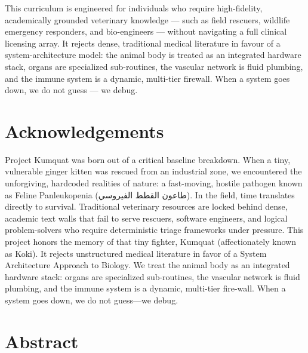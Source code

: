 \documentclass[12pt,oneside]{book}
\newcommand{\ar}[1]{\textarabic{#1}}
\begin{document}
\noindent This curriculum is engineered for individuals who require
high-fidelity, academically grounded veterinary knowledge --- such as
field rescuers, wildlife emergency responders, and bio-engineers ---
without navigating a full clinical licensing array. It rejects dense,
traditional medical literature in favour of a system-architecture model:
the animal body is treated as an integrated hardware stack, organs are
specialized sub-routines, the vascular network is fluid plumbing, and the
immune system is a dynamic, multi-tier firewall. When a system goes down,
we do not guess --- we debug.

\chapter*{Acknowledgements}
\thispagestyle{fancy}

Project Kumquat was born out of a critical baseline breakdown. When a
tiny, vulnerable ginger kitten was rescued from an industrial zone, we
encountered the unforgiving, hardcoded realities of nature: a fast-moving,
hostile pathogen known as Feline Panleukopenia
(\ar{طاعون القطط الفيروسي}). In the field, time translates directly to
survival. Traditional veterinary resources are locked behind dense,
academic text walls that fail to serve rescuers, software engineers, and
logical problem-solvers who require deterministic triage frameworks under
pressure. This project honors the memory of that tiny fighter, Kumquat
(affectionately known as Koki). It rejects unstructured medical literature
in favor of a System Architecture Approach to Biology. We treat the animal
body as an integrated hardware stack: organs are specialized sub-routines,
the vascular network is fluid plumbing, and the immune system is a
dynamic, multi-tier fire-wall. When a system goes down, we do not
guess---we debug.

\chapter*{Abstract}
\thispagestyle{fancy}
\end{document}
